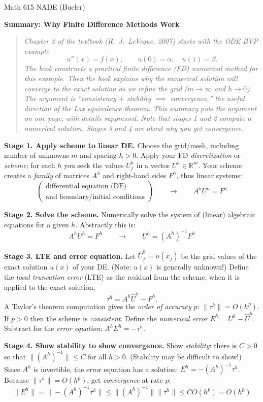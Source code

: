 \documentclass[11pt]{amsart}
\newcommand{\RR}{\mathbb{R}}
\newcommand{\prob}[1]{\bigskip\noindent\textbf{#1.}\quad }
\begin{document}
\scriptsize \noindent Math 615 NADE (Bueler) \hfill \quad {}
\normalsize\medskip

\Large\centerline{\textbf{Summary: Why Finite Difference Methods Work}}
\medskip
\normalsize

\thispagestyle{empty}
\begin{quote}
\emph{Chapter 2 of the textbook (R.~J.~LeVeque, 2007) starts with the ODE BVP example}
	$$u''(x)=f(x), \qquad u(0)=\alpha, \quad u(1) = \beta.$$
\emph{The book constructs a practical finite difference (FD) numerical method for this example.  Then the book explains why the numerical solution will converge to the exact solution as we refine the grid ($m\to\infty$ and $h\to 0$).  The argument is ``consistency $+$ stability $\implies$ convergence,'' the useful direction of the \emph{Lax equivalence theorem}.  This summary puts the argument on one page, with details suppressed.  Note that stages 1 and 2 compute a numerical solution.  Stages 3 and 4 are about why you get convergence.}
\end{quote}

\medskip

\prob{Stage 1.  Apply scheme to linear DE}  Choose the grid/mesh, including number of unknowns $m$ and spacing $h>0$.  Apply your FD \emph{discretization} or \emph{scheme}; for each $h$ you seek the values $U^h_j$ in a vector $U^h \in \RR^m$.  Your scheme creates a \emph{family} of matrices $A^h$ and right-hand sides $F^h$, thus linear systems:
   $$\begin{pmatrix} \text{differential equation (DE)} \\ \text{and boundary/initial conditions} \end{pmatrix} \qquad \to \qquad A^h U^h = F^h$$

\vfill
\prob{Stage 2.  Solve the scheme}  Numerically solve the system of (linear) algebraic equations for a given $h$.  Abstractly this is:
   $$A^h U^h = F^h \qquad \to \qquad U^h = (A^h)^{-1} F^h$$

\vfill
\prob{Stage 3.  LTE and error equation}  Let $\hat U^h_j = u(x_j)$ be the grid values of the exact solution $u(x)$ of your DE.  (Note: $u(x)$ is generally unknown!)  Define the \emph{local truncation error} (LTE) as the residual from the scheme, when it is applied to the exact solution,
   $$\tau^h = A^h \hat U^h - F^h.$$
A Taylor's theorem computation gives the \emph{order of accuracy} $p$: $\|\tau^h\| = O(h^p)$.  If $p>0$ then the scheme is \emph{consistent}.  Define the \emph{numerical error} $E^h = U^h - \hat U^h$.  Subtract for the \emph{error equation}: $A^h E^h = -\tau^h$.

\vfill
\prob{Stage 4.  Show stability to show convergence}  Show \emph{stability}: there is $C>0$ so that $\|(A^h)^{-1}\| \le C$ for all $h>0$.  (Stability may be difficult to show!)  Since $A^h$ is invertible, the error equation has a solution: $E^h = - (A^h)^{-1} \tau^h$.  Because $\|\tau^h\| = O(h^p)$, get \emph{convergence} at rate $p$:
	$$\|E^h\| = \|- (A^h)^{-1} \tau^h\| \le \|(A^h)^{-1}\| \|\tau^h\| \le C O(h^p) = O(h^p)$$

\vfill
\end{document}
